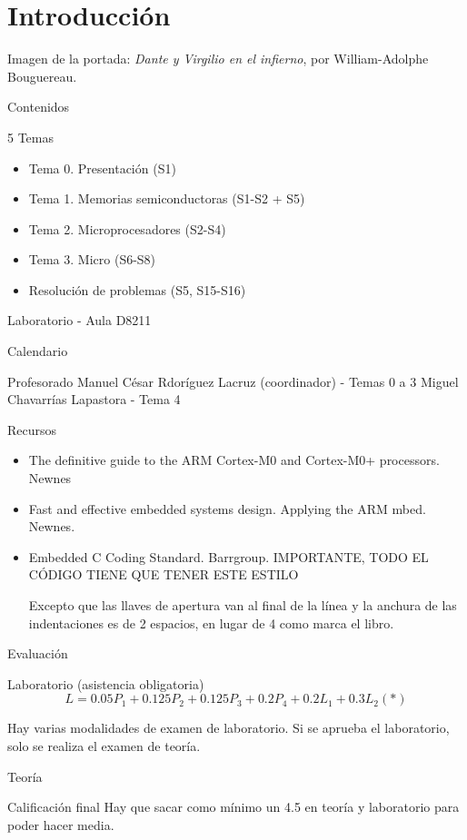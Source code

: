 \documentclass[a4paper]{book}
\begin{document}
\newpage
{}
{}
\section*{Introducción}
Imagen de la portada: \textsl{Dante y Virgilio en el infierno}, por William-Adolphe Bouguereau.

Contenidos 

5 Temas

\begin{itemize}
	 \item Tema 0. Presentación (S1)
	 \item Tema 1. Memorias semiconductoras (S1-S2 + S5)
	 \item Tema 2. Microprocesadores (S2-S4)
	 \item Tema 3. Micro (S6-S8)
	 \item Resolución de problemas (S5, S15-S16)
\end{itemize}

Laboratorio - Aula D8211

Calendario

Profesorado
Manuel César Rdoríguez Lacruz (coordinador) - Temas 0 a 3
Miguel Chavarrías Lapastora - Tema 4

Recursos
\begin{itemize}
	 \item The definitive guide to the ARM Cortex-M0 and Cortex-M0+ processors. Newnes
	 \item Fast and effective embedded systems design. Applying the ARM mbed. Newnes.
	 \item Embedded C Coding Standard. Barrgroup. IMPORTANTE, TODO EL CÓDIGO TIENE QUE TENER ESTE ESTILO
	 
	 Excepto que las llaves de apertura van al final de la línea y la anchura de las indentaciones es de 2 espacios, en lugar de 4 como marca el libro.
\end{itemize}

Evaluación

Laboratorio (asistencia obligatoria)
\[ L = 0.05P_1 + 0.125P_2 + 0.125P_3 +0.2P_4 + 0.2L_1 + 0.3L_2 (*)\]

Hay varias modalidades de examen de laboratorio. Si se aprueba el laboratorio, solo se realiza el examen de teoría.

Teoría

Calificación final
Hay que sacar como mínimo un 4.5 en teoría y laboratorio para poder hacer media.
\end{document}
